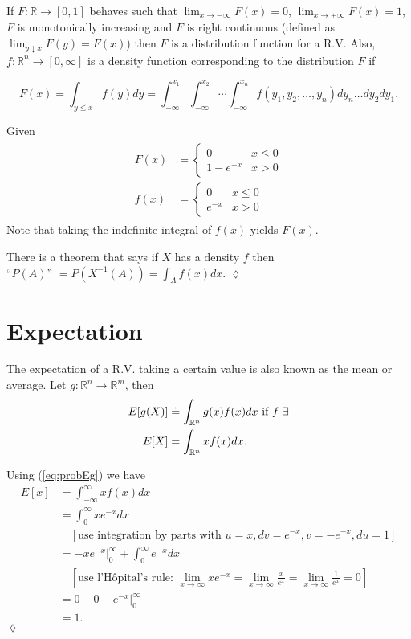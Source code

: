 If $F: \mathbb{R} \to [0,1]$ behaves such that $\lim_{x \to -\infty} F(x) = 0$, $\lim_{x \to +\infty} F(x) = 1$, $F$ is monotonically increasing and $F$ is right continuous (defined as $\lim_{y \downarrow x} F(y) = F(x)$) then $F$ is a distribution function for a R.V.
Also, $f:\mathbb{R}^n \to [0,\infty]$ is a density function corresponding to the distribution $F$ if

\begin{equation*}
F(x) = \int_{y \leq x} f(y)dy = \int_{-\infty}^{x_1} \int_{-\infty}^{x_2}\cdots \int_{-\infty}^{x_n} f(y_1,y_2,\ldots,y_n)dy_n\ldots dy_2dy_1.
\end{equation*}

\begin{example}
Given
\begin{align}
\label{eq:probEg}
\begin{split}
F(x) &= \begin{cases} 0 & x \leq 0 \\ 1-e^{-x} & x > 0 \end{cases} \\
f(x) &= \begin{cases} 0 & x \leq 0 \\ e^{-x} & x > 0 \end{cases}
\end{split}
\end{align}
Note that taking the indefinite integral of $f(x)$ yields $F(x)$.

There is a theorem that says if $X$ has a density $f$ then \\
``$P(A)$'' $= P\left(X^{-1}(A)\right) = \int_A f(x)dx$.
$\lozenge$
\end{example}

\section{Expectation}
The expectation of a R.V. taking a certain value is also known as the mean or average.
Let $g: \mathbb{R}^n \to \mathbb{R}^m$, then
\begin{align*}
E[g(X)] &\doteq \int_{\mathbb{R}^n} g(x)f(x)dx \textnormal{~if~} f~\exists \\
E[X] &= \int_{\mathbb{R}^n}xf(x)dx.
\end{align*}

\begin{example}
Using (\ref{eq:probEg}) we have
\begin{align*}
E[x] &= \int_{-\infty}^\infty xf(x)dx \\
&= \int_0^\infty xe^{-x}dx \\
&\quad [\text{use integration by parts with } u = x, dv = e^{-x}, v = -e^{-x}, du = 1] \\
&= -xe^{-x}\rvert_0^\infty + \int_0^\infty e^{-x}dx \\
&\quad [\text{use l'H\^opital's rule: } \lim_{x \to \infty} xe^{-x} = \lim_{x \to \infty} \frac{x}{e^x} = \lim_{x \to \infty} \frac{1}{e^x} = 0] \\
&= 0 - 0 - e^{-x}\rvert_0^\infty \\
&= 1.
\end{align*}
$\lozenge$
\end{example}

